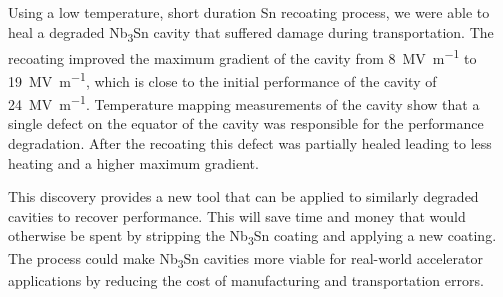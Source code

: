 \documentclass{revtex4-2}
\begin{document}
Using a low temperature, short duration Sn recoating process, we were able to heal a degraded Nb\textsubscript{3}Sn cavity that suffered damage during transportation. The recoating improved the maximum gradient of the cavity from \qty{8}{\mega\volt\per\meter} to \qty{19}{\mega\volt\per\meter}, which is close to the initial performance of the cavity of \qty{24}{\mega\volt\per\meter}. Temperature mapping measurements of the cavity show that a single defect on the equator of the cavity was responsible for the performance degradation. After the recoating this defect was partially healed leading to less heating and a higher maximum gradient.

This discovery provides a new tool that can be applied to similarly degraded cavities to recover performance. This will save time and money that would otherwise be spent by stripping the Nb\textsubscript{3}Sn coating and applying a new coating. The process could make Nb\textsubscript{3}Sn cavities more viable for real-world accelerator applications by reducing the cost of manufacturing and transportation errors.





\end{document}
